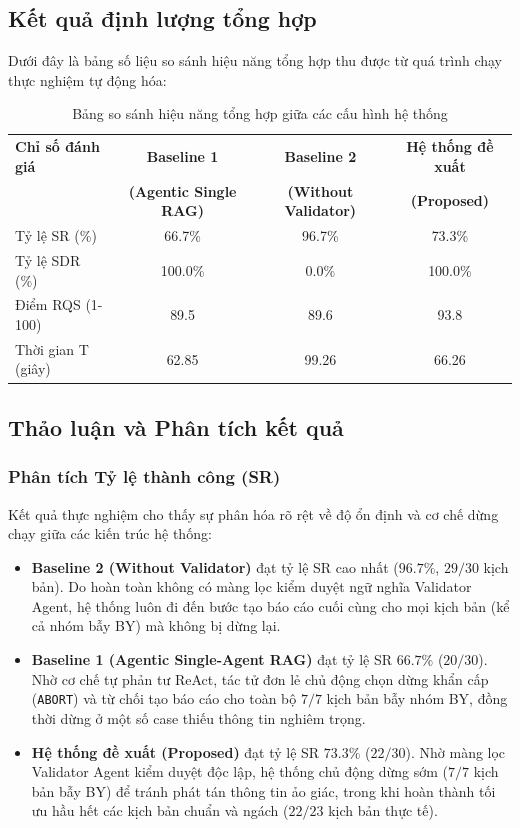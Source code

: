 \documentclass[11pt,a4paper]{article}
\begin{document}
\begin{itemize}
\subsection{Kết quả định lượng tổng hợp}
Dưới đây là bảng số liệu so sánh hiệu năng tổng hợp thu được từ quá trình chạy thực nghiệm tự động hóa:

\begin{table}[H]
\centering
\caption{Bảng so sánh hiệu năng tổng hợp giữa các cấu hình hệ thống}
\label{tab:comparison_results}
\begin{tabular}{lccc}
\toprule
\textbf{Chỉ số đánh giá} & \textbf{Baseline 1} & \textbf{Baseline 2} & \textbf{Hệ thống đề xuất} \\
 & \textbf{(Agentic Single RAG)} & \textbf{(Without Validator)} & \textbf{(Proposed)} \\
\midrule
Tỷ lệ SR (\%) & 66.7\% & 96.7\% & 73.3\% \\
Tỷ lệ SDR (\%) & 100.0\% & 0.0\% & 100.0\% \\
Điểm RQS (1-100) & 89.5 & 89.6 & 93.8 \\
Thời gian T (giây) & 62.85 & 99.26 & 66.26 \\
\bottomrule
\end{tabular}
\end{table}

\subsection{Thảo luận và Phân tích kết quả}

\subsubsection{Phân tích Tỷ lệ thành công (SR)}
Kết quả thực nghiệm cho thấy sự phân hóa rõ rệt về độ ổn định và cơ chế dừng chạy giữa các kiến trúc hệ thống:
\begin{itemize}
    \item \textbf{Baseline 2 (Without Validator)} đạt tỷ lệ SR cao nhất ($96.7\%$, $29/30$ kịch bản). Do hoàn toàn không có màng lọc kiểm duyệt ngữ nghĩa Validator Agent, hệ thống luôn đi đến bước tạo báo cáo cuối cùng cho mọi kịch bản (kể cả nhóm bẫy BY) mà không bị dừng lại.
    \item \textbf{Baseline 1 (Agentic Single-Agent RAG)} đạt tỷ lệ SR $66.7\%$ ($20/30$). Nhờ cơ chế tự phản tư ReAct, tác tử đơn lẻ chủ động chọn dừng khẩn cấp (\texttt{ABORT}) và từ chối tạo báo cáo cho toàn bộ $7/7$ kịch bản bẫy nhóm BY, đồng thời dừng ở một số case thiếu thông tin nghiêm trọng.
    \item \textbf{Hệ thống đề xuất (Proposed)} đạt tỷ lệ SR $73.3\%$ ($22/30$). Nhờ màng lọc Validator Agent kiểm duyệt độc lập, hệ thống chủ động dừng sớm ($7/7$ kịch bản bẫy BY) để tránh phát tán thông tin ảo giác, trong khi hoàn thành tối ưu hầu hết các kịch bản chuẩn và ngách ($22/23$ kịch bản thực tế).
\end{itemize}


\end{itemize}
\end{document}
